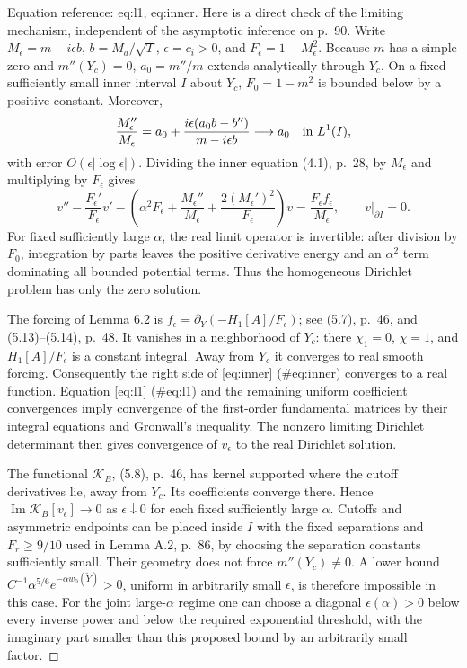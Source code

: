 \documentclass[10pt]{article}
\begin{document}
Equation reference: eq:l1, eq:inner. Here is a direct check of the limiting mechanism, independent of the asymptotic inference on p. 90. Write \(M_\epsilon=m-i\epsilon b\), \(b=M_a/\sqrt T\), \(\epsilon=c_i>0\), and \(F_\epsilon=1-M_\epsilon^2\). Because \(m\) has a simple zero and \(m''(Y_c)=0\), \(a_0=m''/m\) extends analytically through \(Y_c\). On a fixed sufficiently small inner interval \(I\) about \(Y_c\), \(F_0=1-m^2\) is bounded below by a positive constant. Moreover, \[\frac{M_\epsilon''}{M_\epsilon}
 =a_0+\frac{i\epsilon(a_0b-b'')}{m-i\epsilon b}
 \longrightarrow a_0\quad\hbox{in }L^1(I),
 \] with error \(O(\epsilon|\log\epsilon|)\). Dividing the inner equation (4.1), p. 28, by \(M_\epsilon\) and multiplying by \(F_\epsilon\) gives \[v''-\frac{F_\epsilon'}{F_\epsilon}v'
 -\left(\alpha^2F_\epsilon+
 \frac{M_\epsilon''}{M_\epsilon}
 +\frac{2(M_\epsilon')^2}{F_\epsilon}\right)v
 =\frac{F_\epsilon f_\epsilon}{M_\epsilon},
 \qquad v|_{\partial I}=0.
 \] For fixed sufficiently large \(\alpha\), the real limit operator is invertible: after division by \(F_0\), integration by parts leaves the positive derivative energy and an \(\alpha^2\) term dominating all bounded potential terms. Thus the homogeneous Dirichlet problem has only the zero solution.\par
The forcing of Lemma 6.2 is \(f_\epsilon=\partial_Y(-H_1[A]/F_\epsilon)\); see (5.7), p. 46, and (5.13)–(5.14), p. 48. It vanishes in a neighborhood of \(Y_c\): there \(\chi_1=0\), \(\chi=1\), and \(H_1[A]/F_\epsilon\) is a constant integral. Away from \(Y_c\) it converges to real smooth forcing. Consequently the right side of [eq:inner] (\#eq:inner) converges to a real function. Equation [eq:l1] (\#eq:l1) and the remaining uniform coefficient convergences imply convergence of the first-order fundamental matrices by their integral equations and Gronwall’s inequality. The nonzero limiting Dirichlet determinant then gives convergence of \(v_\epsilon\) to the real Dirichlet solution.\par
The functional \(\mathcal K_B\), (5.8), p. 46, has kernel supported where the cutoff derivatives lie, away from \(Y_c\). Its coefficients converge there. Hence \(\operatorname{Im}\mathcal K_B[v_\epsilon]\to0\) as \(\epsilon\downarrow0\) for each fixed sufficiently large \(\alpha\). Cutoffs and asymmetric endpoints can be placed inside \(I\) with the fixed separations and \(F_r\geq9/10\) used in Lemma A.2, p. 86, by choosing the separation constants sufficiently small. Their geometry does not force \(m''(Y_c)\ne0\). A lower bound \(C^{-1}\alpha^{5/6}
e^{-\alpha w_0(\widetilde Y)}>0\), uniform in arbitrarily small \(\epsilon\), is therefore impossible in this case. For the joint large-\(\alpha\) regime one can choose a diagonal \(\epsilon(\alpha)>0\) below every inverse power and below the required exponential threshold, with the imaginary part smaller than this proposed bound by an arbitrarily small factor. ◻\par
\end{document}
